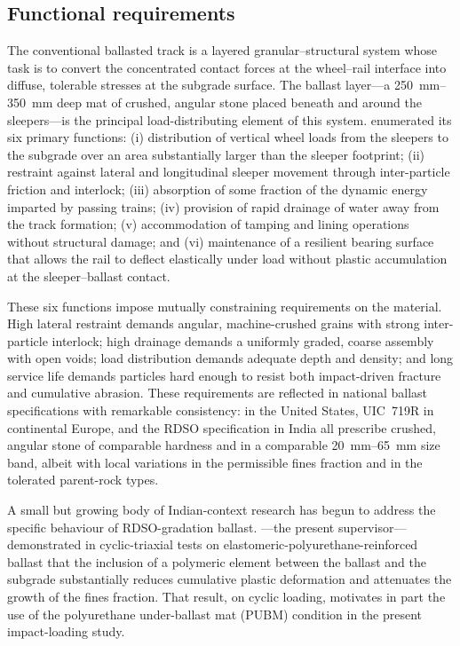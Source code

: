\subsection{Functional requirements}
\label{sec:functional}

The conventional ballasted track is a layered granular--structural system whose task is to convert the concentrated contact forces at the wheel--rail interface into diffuse, tolerable stresses at the subgrade surface. The ballast layer---a \qtyrange{250}{350}{\mm} deep mat of crushed, angular stone placed beneath and around the sleepers---is the principal load-distributing element of this system. \citet{selig1994} enumerated its six primary functions: (i) distribution of vertical wheel loads from the sleepers to the subgrade over an area substantially larger than the sleeper footprint; (ii) restraint against lateral and longitudinal sleeper movement through inter-particle friction and interlock; (iii) absorption of some fraction of the dynamic energy imparted by passing trains; (iv) provision of rapid drainage of water away from the track formation; (v) accommodation of tamping and lining operations without structural damage; and (vi) maintenance of a resilient bearing surface that allows the rail to deflect elastically under load without plastic accumulation at the sleeper--ballast contact.

These six functions impose mutually constraining requirements on the material. High lateral restraint demands angular, machine-crushed grains with strong inter-particle interlock; high drainage demands a uniformly graded, coarse assembly with open voids; load distribution demands adequate depth and density; and long service life demands particles hard enough to resist both impact-driven fracture and cumulative abrasion. These requirements are reflected in national ballast specifications with remarkable consistency: \citet{arema2020} in the United States, UIC~719R in continental Europe, and the RDSO specification \citep{rdso2023} in India all prescribe crushed, angular stone of comparable hardness and in a comparable \qtyrange{20}{65}{\mm} size band, albeit with local variations in the permissible fines fraction and in the tolerated parent-rock types.

A small but growing body of Indian-context research has begun to address the specific behaviour of RDSO-gradation ballast. \citet{gundavaram2023}---the present supervisor---demonstrated in cyclic-triaxial tests on elastomeric-polyurethane-reinforced ballast that the inclusion of a polymeric element between the ballast and the subgrade substantially reduces cumulative plastic deformation and attenuates the growth of the fines fraction. That result, on cyclic loading, motivates in part the use of the polyurethane under-ballast mat (PUBM) condition in the present impact-loading study.

